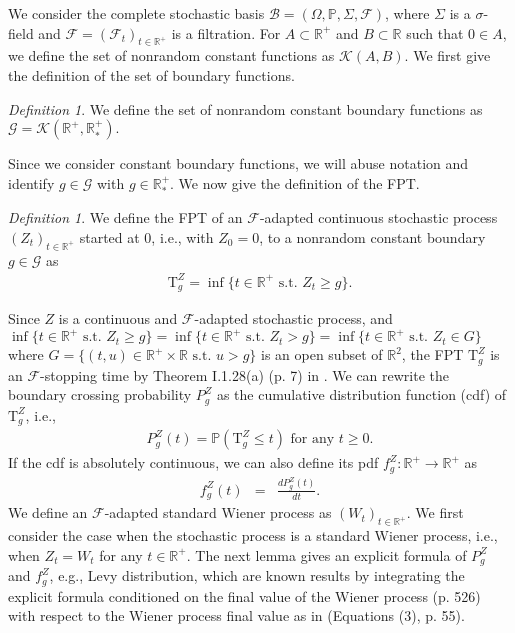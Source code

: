 \documentclass[aop]{imsart}
\theoremstyle{plain}
\theoremstyle{remark}
\newtheorem{definition}[theorem]{Definition}
\newcommand{\reels}{\mathbb{R}}
\newcommand{\proba}{\mathbb{P}}
\newcommand{\Tau}{\mathrm{T}}
\begin{document}
We consider the complete stochastic basis $\mathcal{B} = (\Omega, \proba, \Sigma, \mathcal{F})$, where $\Sigma$ is a $\sigma$-field and $\mathcal{F} = (\mathcal{F}_t)_{t \in \reels^+}$ is a filtration. For $A \subset \reels^+$ and $B \subset \reels$ such that $0 \in A$, we define the set of nonrandom constant functions as $\mathcal{K}(A,B)$. We first give the definition of the set of boundary functions. 
\begin{definition}\label{defboundaryset_nrc1}
We define the set of nonrandom constant boundary functions as $\mathcal{G} = \mathcal{K} (\reels^+,\reels_*^+).$
\end{definition}
\noindent Since we consider constant boundary functions, we will abuse notation and identify $g \in \mathcal{G}$ with $g \in \reels_*^+$. We now give the definition of the FPT. 
\begin{definition}\label{defFPT_nrc1}
We define the FPT of an $\mathcal{F}$-adapted continuous stochastic process $(Z_t)_{t \in \reels^+}$ started at 0, i.e., with $Z_0=0$, to a nonrandom constant boundary
$g \in \mathcal{G}$ as
\begin{eqnarray}
\label{TgZdef_nrc1}
\Tau_g^Z = \inf \{t \in \reels^+ \text{ s.t. } Z_t \geq g\}.
\end{eqnarray}
\end{definition}
\noindent Since $Z$ is a continuous and 
$\mathcal{F}$-adapted stochastic process, and $\inf \{t \in \reels^+ \text{ s.t. } Z_t \geq g\} = \inf \{t \in \reels^+ \text{ s.t. } Z_t > g\} = \inf \{t \in \reels^+ \text{ s.t. } Z_t \in G\}$ where $G= \{(t,u) \in \reels^+ \times \reels \text{ s.t. } u > g\}$ is an open subset of $\reels^2$, the FPT $\Tau_{g}^{Z}$ is an $\mathcal{F}$-stopping time by Theorem I.1.28(a) (p. 7) in \cite{JacodLimit2003}. We can rewrite the boundary crossing probability $P_g^Z$ as the cumulative distribution function (cdf) of $\Tau_g^Z$, i.e., 
\begin{eqnarray}
\label{PgZdef_nrc1}
P_g^Z(t)= \proba (\Tau^Z_g \leq t) \text{ for any } t \geq 0.
\end{eqnarray}
If the cdf is absolutely continuous, we can also define its pdf $f_g^Z: \reels^+  \rightarrow  \reels^+$ as
\begin{eqnarray}
\label{fZgt_nrc1}
f_g^Z(t) & = & \frac{dP_g^Z(t)}{dt}.
\end{eqnarray}
We define an $\mathcal{F}$-adapted standard Wiener process as $(W_t)_{t \in \reels^+}$. We first consider the case when the stochastic process is a standard Wiener process, i.e., when $Z_t = W_t$ for any $t \in \reels^+$. The next lemma gives an explicit formula of $P_g^Z$ and $f_g^Z$, e.g., Levy distribution, which are known results by integrating the explicit formula conditioned on the final value of the Wiener process \cite{malmquist1954certain} (p. 526) with respect to the Wiener process final value as in \cite{wang1997boundary} (Equations (3), p. 55).
\end{document}

